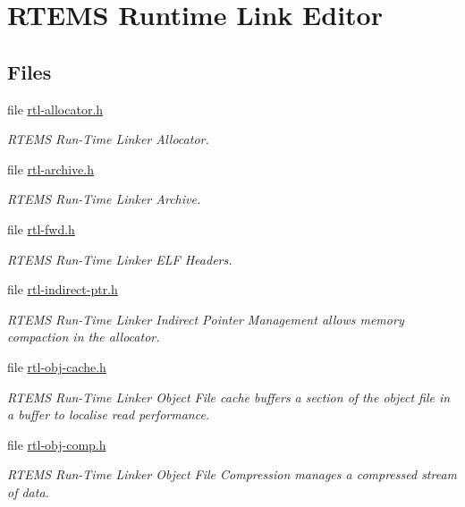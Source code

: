 \hypertarget{group__rtems__rtl}{}\section{R\+T\+E\+MS Runtime Link Editor}
\label{group__rtems__rtl}
\subsection*{Files}
\begin{DoxyCompactItemize}
\item 
file \mbox{\hyperlink{rtl-allocator_8h}{rtl-\/allocator.\+h}}
\begin{DoxyCompactList}\small\item\em R\+T\+E\+MS Run-\/\+Time Linker Allocator. \end{DoxyCompactList}\item 
file \mbox{\hyperlink{rtl-archive_8h}{rtl-\/archive.\+h}}
\begin{DoxyCompactList}\small\item\em R\+T\+E\+MS Run-\/\+Time Linker Archive. \end{DoxyCompactList}\item 
file \mbox{\hyperlink{rtl-fwd_8h}{rtl-\/fwd.\+h}}
\begin{DoxyCompactList}\small\item\em R\+T\+E\+MS Run-\/\+Time Linker E\+LF Headers. \end{DoxyCompactList}\item 
file \mbox{\hyperlink{rtl-indirect-ptr_8h}{rtl-\/indirect-\/ptr.\+h}}
\begin{DoxyCompactList}\small\item\em R\+T\+E\+MS Run-\/\+Time Linker Indirect Pointer Management allows memory compaction in the allocator. \end{DoxyCompactList}\item 
file \mbox{\hyperlink{rtl-obj-cache_8h}{rtl-\/obj-\/cache.\+h}}
\begin{DoxyCompactList}\small\item\em R\+T\+E\+MS Run-\/\+Time Linker Object File cache buffers a section of the object file in a buffer to localise read performance. \end{DoxyCompactList}\item 
file \mbox{\hyperlink{rtl-obj-comp_8h}{rtl-\/obj-\/comp.\+h}}
\begin{DoxyCompactList}\small\item\em R\+T\+E\+MS Run-\/\+Time Linker Object File Compression manages a compressed stream of data. \end{DoxyCompactList}\item 

\end{DoxyCompactItemize}

